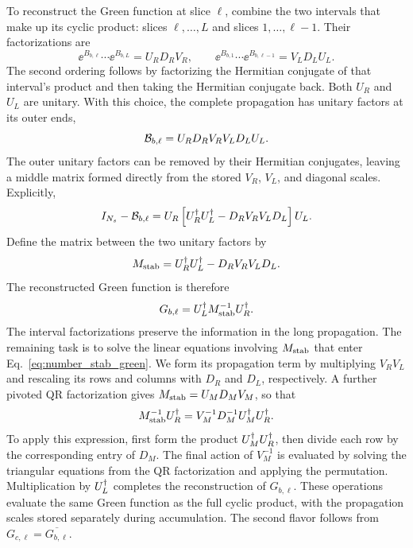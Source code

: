 To reconstruct the Green function at slice $\ell$, combine the two intervals that make up its cyclic product: slices $\ell,\ldots,L$ and slices $1,\ldots,\ell-1$. Their factorizations are
\begin{equation}
    \ee^{B_{b,\ell}}\cdots\ee^{B_{b,L}}=U_RD_RV_R,
    \qquad
    \ee^{B_{b,1}}\cdots\ee^{B_{b,\ell-1}}=V_LD_LU_L.
\end{equation}
The second ordering follows by factorizing the Hermitian conjugate of that interval's product and then taking the Hermitian conjugate back. Both $U_R$ and $U_L$ are unitary. With this choice, the complete propagation has unitary factors at its outer ends,
\begin{equation}
    \mathcal{B}_{b,\ell}=U_RD_RV_RV_LD_LU_L.
    \label{eq:number_stab_product}
\end{equation}
The outer unitary factors can be removed by their Hermitian conjugates, leaving a middle matrix formed directly from the stored $V_R$, $V_L$, and diagonal scales. Explicitly,
\begin{equation}
    I_{N_s}-\mathcal{B}_{b,\ell}
    =U_R\left[U_R^\dagger U_L^\dagger-D_RV_RV_LD_L\right]U_L.
\end{equation}
Define the matrix between the two unitary factors by
\begin{equation}
    M_{\rm stab}=U_R^\dagger U_L^\dagger-D_RV_RV_LD_L.
    \label{eq:number_mstab_def}
\end{equation}
The reconstructed Green function is therefore
\begin{equation}
    G_{b,\ell}=U_L^\dagger M_{\rm stab}^{-1}U_R^\dagger.
    \label{eq:number_stab_green}
\end{equation}
The interval factorizations preserve the information in the long propagation. The remaining task is to solve the linear equations involving $M_{\rm stab}$ that enter Eq.~\eqref{eq:number_stab_green}. We form its propagation term by multiplying $V_RV_L$ and rescaling its rows and columns with $D_R$ and $D_L$, respectively. A further pivoted QR factorization gives $M_{\rm stab}=U_MD_MV_M$, so that
\begin{equation}
    M_{\rm stab}^{-1}U_R^\dagger
    =V_M^{-1}D_M^{-1}U_M^\dagger U_R^\dagger.
\end{equation}
To apply this expression, first form the product $U_M^\dagger U_R^\dagger$, then divide each row by the corresponding entry of $D_M$. The final action of $V_M^{-1}$ is evaluated by solving the triangular equations from the QR factorization and applying the permutation. Multiplication by $U_L^\dagger$ completes the reconstruction of $G_{b,\ell}$. These operations evaluate the same Green function as the full cyclic product, with the propagation scales stored separately during accumulation. The second flavor follows from $G_{c,\ell}=\overline{G_{b,\ell}}$.

